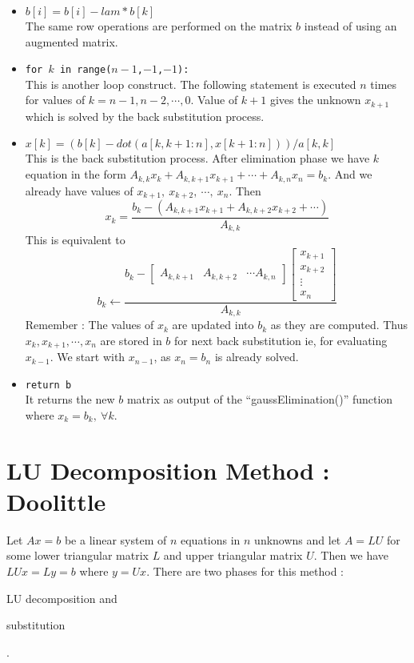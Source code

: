 \begin{remark}
\begin{commentary}
\begin{itemize}
	\item \texttt{$b[i] = b[i]-lam*b[k]$} \\ The same row operations are performed on the matrix $b$ instead of using an augmented matrix.
	\item \texttt{for $k$ in range($n-1$,$-1$,$-1$):} \\ This is another loop construct. The following statement is executed $n$ times for values of $k = n-1, n-2, \cdots, 0$. Value of $k+1$ gives the unknown $x_{k+1}$ which is solved by the back substitution process.
	\item \texttt{$x[k] = (b[k]-dot(a[k,k+1:n],x[k+1:n]))/a[k,k]$} \\ This is the back substitution process. After elimination phase we have $k$ equation in the form $A_{k,k}x_{k} + A_{k,k+1}x_{k+1}+\cdots+A_{k,n}x_n = b_k$. And we already have values of $x_{k+1},\ x_{k+2},\ \cdots,\ x_n$. Then
	\[x_{k} = \frac{b_k - (A_{k,k+1}x_{k+1} + A_{k,k+2}x_{k+2}+\cdots)}{A_{k,k}}\]
	This is equivalent to 
	\[ b_k \leftarrow \frac{ b_k - \begin{bmatrix}A_{k,k+1} & A_{k,k+2} & \cdots A_{k,n} \end{bmatrix}\begin{bmatrix} x_{k+1} \\ x_{k+2} \\ \vdots \\ x_n \end{bmatrix}}{A_{k,k}} \]
	Remember : The values of $x_k$ are updated into $b_k$ as they are computed. Thus $x_{k}, x_{k+1}, \cdots, x_n$ are stored in $b$ for next back substitution ie, for evaluating $x_{k-1}$. We start with $x_{n-1}$, as $x_n = b_n$ is already solved.
	\item \texttt{return b} \\ It returns the new $b$ matrix as output of the ``gaussElimination()'' function where $x_k = b_k,\ \forall k$.
\end{itemize}
\end{commentary}
\end{remark}

\section{LU Decomposition Method : Doolittle}
	Let $Ax = b$ be a linear system of $n$ equations in $n$ unknowns and let $A = LU$ for some lower triangular matrix $L$ and upper triangular matrix $U$. Then we have $LUx = Ly = b$ where $y = Ux$. There are two phases for this method : \begin{enumerate*} \item LU decomposition and \item substitution \end{enumerate*}.\\

